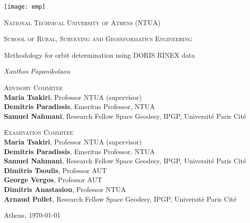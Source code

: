 \begin{center}
  \texttt{[image: emp]}\par\vspace{.8cm}
  {\Large \textsc{National Technical University of Athens (NTUA)} \par}
  {\Large \textsc{School of Rural, Surveying and Geoinformatics Engineering} \par}
  \vspace{.5cm}
  {\huge Methodology for orbit determination using DORIS RINEX data \par}
  \vspace{1cm}
  {\Large\itshape Xanthos Papanikolaou\par}
  \vfill

  \textsc{Advisory Commitee}\\
  \textbf{Maria Tsakiri}, Professor NTUA (supervisor)\\
  \textbf{Demitris Paradissis}, Emeritus Professor, NTUA \\
  \textbf{Samuel Nahmani}, Research Fellow Space Geodesy, IPGP, Université Paris Cité \par

  \textsc{Examination Commitee}\\
  \textbf{Maria Tsakiri}, Professor NTUA (supervisor)\\
  \textbf{Demitris Paradissis}, Emeritus Professor, NTUA \\
  \textbf{Samuel Nahmani}, Research Fellow Space Geodesy, IPGP, Université Paris Cité \\
  \textbf{Dimitris Tsoulis}, Professor AUT \\
  \textbf{George Vergos}, Professor AUT \\
  \textbf{Dimitris Anastasiou}, Professor NTUA \\
  \textbf{Arnaud Pollet}, Research Fellow Space Geodesy, IPGP, Université Paris Cité \par

  \vfill
  {\large Athens, \monthyeardate\today\par}
\end{center}
\clearpage

